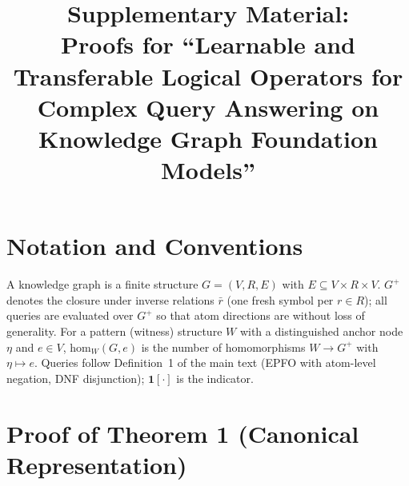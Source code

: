 \documentclass[journal]{IEEEtran}
\newcommand{\homc}{\mathrm{hom}}
\begin{document}
\title{Supplementary Material:\\
Proofs for ``Learnable and Transferable Logical Operators for Complex
Query Answering on Knowledge Graph Foundation Models''}

\author{}
\maketitle

\section{Notation and Conventions}

A knowledge graph is a finite structure $G=(V,R,E)$ with
$E\subseteq V\times R\times V$. $G^{+}$ denotes the closure under inverse
relations $\bar r$ (one fresh symbol per $r\in R$); all queries are
evaluated over $G^{+}$ so that atom directions are without loss of
generality. For a pattern (witness) structure $W$ with a distinguished
anchor node $\eta$ and $e\in V$, $\homc_W(G,e)$ is the number of
homomorphisms $W\to G^{+}$ with $\eta\mapsto e$. Queries follow
Definition~1 of the main text (EPFO with atom-level negation, DNF
disjunction); $\mathbf 1[\cdot]$ is the indicator.

\section{Proof of Theorem 1 (Canonical Representation)}
\end{document}
